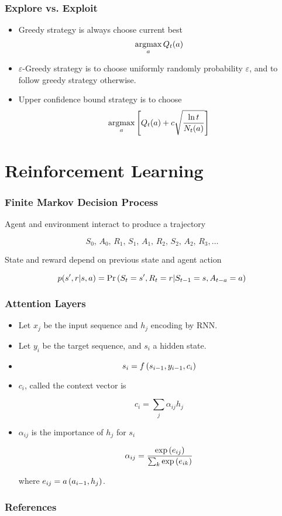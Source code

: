\documentclass{beamer}
\begin{document}
\frame
{
   \frametitle{Explore vs. Exploit}

   \begin{itemize}
      \item<1-> Greedy strategy is always choose current best 
      $$\operatorname*{argmax}_a Q_t(a)$$
      
      \item<2-> $\varepsilon$-Greedy strategy is to choose uniformly randomly
      probability $\varepsilon$, and to follow greedy strategy otherwise.
      
      \item<3-> Upper confidence bound strategy is to choose
      $$\operatorname*{argmax}_a \left[{Q_t(a) + c \sqrt{\frac{\ln t}{N_t(a)}}}\right]$$
      
   \end{itemize}
}

\section{Reinforcement Learning}

\frame
{
   \frametitle{Finite Markov Decision Process}
   
   Agent and environment interact to produce a trajectory
   
   $$S_0,\,A_0,\,R_1,\,S_1,\,A_1,\,R_2,\,S_2,\,A_2,\,R_3,\dots$$
   
   State and reward depend on previous state and agent action
   
   $$p(s', r | s, a) = \Pr \left({S_t=s', R_t=r | S_{t-1}=s,A_{t-a}=a}\right)$$
}

\frame
{
   \frametitle{Attention Layers}

   \begin{itemize}
      \item<1-> Let $x_j$ be the input sequence and $h_j$ encoding by RNN.

      \item<2-> Let $y_i$ be the target sequence, and $s_i$ a hidden state.

      \item<3-> $$s_i = f \left({s_{i-1}, y_{i-1}, c_i}\right)$$

      \item<4-> $c_i$, called the context vector is

      $$c_i = \sum_j \alpha_{ij} h_j$$

      \item<5-> $\alpha_{ij}$ is the importance of $h_j$ for $s_i$

      $$\alpha_{ij} = \frac{\exp \left({e_{ij}}\right)} {\sum_k \exp \left({e_{ik}}\right)}$$

      where $e_{ij} = a \left({a_{i-1}, h_j}\right)$.

      
   \end{itemize}
}

\begin{frame}[t,allowframebreaks]
   \frametitle{References}
   \printbibliography
\end{frame}
\end{document}
